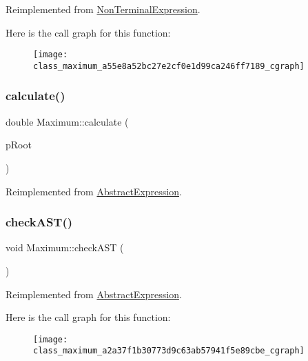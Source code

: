 Reimplemented from \mbox{\hyperlink{class_non_terminal_expression_aa65153b69523e01d86893f6d7b7fc480}{Non\+Terminal\+Expression}}.

Here is the call graph for this function\+:
\nopagebreak
\begin{figure}[H]
\begin{center}
\leavevmode
\texttt{[image: class\_maximum\_a55e8a52bc27e2cf0e1d99ca246ff7189\_cgraph]}
\end{center}
\end{figure}
\mbox{\label{class_maximum_ab10a5344f64954905d17d72f4573f805}} 
\subsubsection{\texorpdfstring{calculate()}{calculate()}}
{\footnotesize\ttfamily double Maximum\+::calculate (\begin{DoxyParamCaption}\item[{std\+::unique\+\_\+ptr$<$ \mbox{\hyperlink{class_abstract_expression}{Abstract\+Expression}} $>$ \&}]{p\+Root }\end{DoxyParamCaption})\hspace{0.3cm}{\ttfamily [virtual]}}



Reimplemented from \mbox{\hyperlink{class_abstract_expression_a1c9871ee669668c2eb9f1f1a7d6f5d32}{Abstract\+Expression}}.

\mbox{\label{class_maximum_a2a37f1b30773d9c63ab57941f5e89cbe}} 
\subsubsection{\texorpdfstring{checkAST()}{checkAST()}}
{\footnotesize\ttfamily void Maximum\+::check\+A\+ST (\begin{DoxyParamCaption}{ }\end{DoxyParamCaption})\hspace{0.3cm}{\ttfamily [virtual]}}



Reimplemented from \mbox{\hyperlink{class_abstract_expression_a703563fdf65d18ce4b7f2817e2ff4581}{Abstract\+Expression}}.

Here is the call graph for this function\+:
\nopagebreak
\begin{figure}[H]
\begin{center}
\leavevmode
\texttt{[image: class\_maximum\_a2a37f1b30773d9c63ab57941f5e89cbe\_cgraph]}
\end{center}
\end{figure}
\mbox{\label{class_maximum_ad1f010f3efa2b463a6ab53c8bfaccbb8}} 
